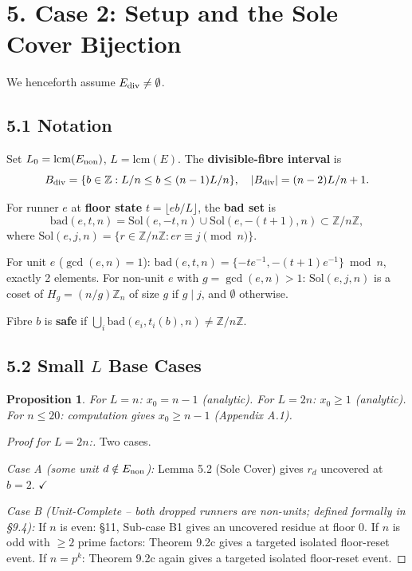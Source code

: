 \documentclass[11pt,a4paper]{article}
\theoremstyle{plain}
\newtheorem{proposition}[theorem]{Proposition}
\theoremstyle{definition}
\theoremstyle{remark}
\begin{document}
\medskip



\section{5. Case 2: Setup and the Sole Cover Bijection}


We henceforth assume $E_{\rm div} \neq \emptyset$.


\subsection{5.1 Notation}


Set $L_0 = \mathrm{lcm}(E_{\rm non})$, $L = \mathrm{lcm}(E)$. The \textbf{divisible-fibre interval} is
\[B_{\rm div} = \{b \in \mathbb{Z} : L/n \leq b \leq (n-1)L/n\}, \quad |B_{\rm div}| = (n-2)L/n + 1.\]

For runner $e$ at \textbf{floor state} $t = \lfloor eb/L \rfloor$, the \textbf{bad set} is
\[\mathrm{bad}(e, t, n) = \mathrm{Sol}(e, -t, n) \cup \mathrm{Sol}(e, -(t+1), n) \subset \mathbb{Z}/n\mathbb{Z},\]
where $\mathrm{Sol}(e, j, n) = \{r \in \mathbb{Z}/n\mathbb{Z} : er \equiv j \pmod{n}\}$.

For unit $e$ ($\gcd(e,n)=1$): $\mathrm{bad}(e,t,n) = \{-te^{-1}, -(t+1)e^{-1}\} \bmod n$, exactly 2 elements. For non-unit $e$ with $g = \gcd(e,n) > 1$: $\mathrm{Sol}(e,j,n)$ is a coset of $H_g = (n/g)\mathbb{Z}_n$ of size $g$ if $g \mid j$, and $\emptyset$ otherwise.

Fibre $b$ is \textbf{safe} if $\bigcup_i \mathrm{bad}(e_i, t_i(b), n) \neq \mathbb{Z}/n\mathbb{Z}$.


\subsection{5.2 Small $L$ Base Cases}



\begin{proposition}
For $L = n$: $x_0 = n-1$ (analytic). For $L = 2n$: $x_0 \geq 1$ (analytic). For $n \leq 20$: computation gives $x_0 \geq n-1$ (Appendix A.1).

\end{proposition}

\begin{proof}[Proof for $L = 2n$:]
Two cases.

\textit{Case A (some unit $d \notin E_{\rm non}$):} Lemma 5.2 (Sole Cover) gives $r_d$ uncovered at $b=2$. $\checkmark$

\textit{Case B (Unit-Complete -- both dropped runners are non-units; defined formally in §9.4):} If $n$ is even: §11, Sub-case B1 gives an uncovered residue at floor 0. If $n$ is odd with $\geq 2$ prime factors: Theorem 9.2c gives a targeted isolated floor-reset event. If $n = p^k$: Theorem 9.2c again gives a targeted isolated floor-reset event.
\end{proof}
\end{document}
